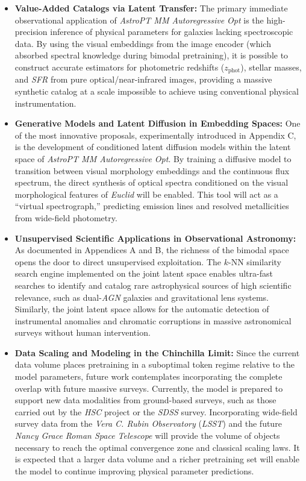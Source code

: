 \begin{itemize}
	\item \textbf{Value-Added Catalogs via Latent Transfer:} 
	The primary immediate observational application of \textit{AstroPT MM Autoregressive Opt} is the high-precision inference of physical parameters for galaxies lacking spectroscopic data. By using the visual embeddings from the image encoder (which absorbed spectral knowledge during bimodal pretraining), it is possible to construct accurate estimators for photometric redshifts ($z_{\text{phot}}$), stellar masses, and \textit{\gls{SFR}} from pure optical/near-infrared images, providing a massive synthetic catalog at a scale impossible to achieve using conventional physical instrumentation.
	
	\item \textbf{Generative Models and Latent Diffusion in Embedding Spaces:} 
	One of the most innovative proposals, experimentally introduced in Appendix C, is the development of conditioned latent diffusion models within the latent space of \textit{AstroPT MM Autoregressive Opt}. By training a diffusive model to transition between visual morphology embeddings and the continuous flux spectrum, the direct synthesis of optical spectra conditioned on the visual morphological features of \textit{Euclid} will be enabled. This tool will act as a ``virtual spectrograph,'' predicting emission lines and resolved metallicities from wide-field photometry.
	
	\item \textbf{Unsupervised Scientific Applications in Observational Astronomy:} 
	As documented in Appendices A and B, the richness of the bimodal space opens the door to direct unsupervised exploitation. The $k$-NN similarity search engine implemented on the joint latent space enables ultra-fast searches to identify and catalog rare astrophysical sources of high scientific relevance, such as dual-\textit{\gls{AGN}} galaxies and gravitational lens systems. Similarly, the joint latent space allows for the automatic detection of instrumental anomalies and chromatic corruptions in massive astronomical surveys without human intervention.
	
	\item \textbf{Data Scaling and Modeling in the Chinchilla Limit:} 
	Since the current data volume places pretraining in a suboptimal token regime relative to the model parameters, future work contemplates incorporating the complete overlap with future massive surveys. Currently, the model is prepared to support new data modalities from ground-based surveys, such as those carried out by the \textit{\gls{HSC}} project or the \textit{\gls{SDSS}} survey. Incorporating wide-field survey data from the \textit{Vera C. Rubin Observatory} (\textit{\gls{LSST}}) and the future \textit{Nancy Grace Roman Space Telescope} will provide the volume of objects necessary to reach the optimal convergence zone and classical scaling laws. It is expected that a larger data volume and a richer pretraining set will enable the model to continue improving physical parameter predictions.
	

\end{itemize}
